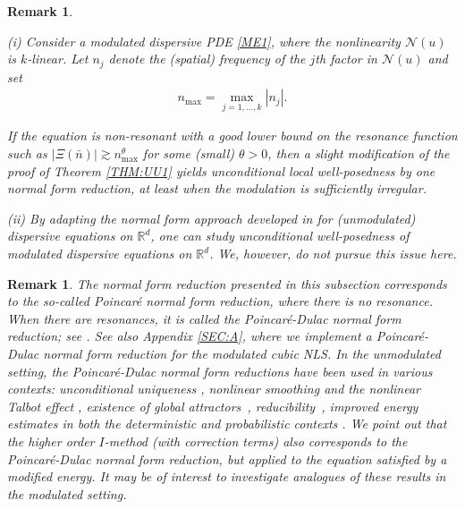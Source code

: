 \documentclass[letterpaper, 11pt,  reqno]{amsart}
\newtheorem{remark}[theorem]{Remark}
\newcommand{\1}{\hspace{0.5mm}\text{I}\hspace{0.5mm}}
\newcommand{\noi}{\noindent}
\newcommand{\R}{\mathbb{R}}
\newcommand{\ta}{\theta}
\newcommand{\ges}{\gtrsim}
\newcommand{\NN}{\mathcal{N}}
\numberwithin{equation}{section}
\numberwithin{theorem}{section}
\begin{document}
\begin{remark}\label{REM:NF9}
\rm


(i) 
Consider 
a modulated dispersive PDE \eqref{ME1}, 
where the nonlinearity $\NN(u)$
is $k$-linear.
Let $n_j$ denote the (spatial) frequency 
of the $j$th factor in $\NN(u)$
and set 
\begin{align}
n_{\max} = \max_{j = 1, \dots, k} |n_j|.
\label{max1}
\end{align}

\noi
If the equation is {\it non-resonant}
with a good lower bound on the resonance function
such as  
$|\Xi(\bar n)|\ges n_{\max}^\ta$
for some (small) $\ta > 0$, 
then
a slight modification of the proof of Theorem \ref{THM:UU1}
yields 
unconditional local well-posedness
by one normal form reduction, 
at least when the modulation is sufficiently irregular.



 




\smallskip

\noi
(ii) 
By adapting the normal form approach 
developed in 
\cite{KOY, Ki2, FO}
for (unmodulated) dispersive equations on $\R^d$, 
one can study unconditional well-posedness of modulated 
dispersive equations on $\R^d$.
We, however, do not pursue this issue here.


\end{remark}








\begin{remark}\label{REM:NF1} \rm
The normal form reduction
presented in this subsection
corresponds to the so-called Poincar\'e normal form reduction, 
where there is no resonance.
When there are resonances, it is called
the Poincar\'e-Dulac normal form reduction;
see \cite[Section 1]{GKO}.
See also Appendix 
 \ref{SEC:A}, 
where 
we implement a Poincar\'e-Dulac normal form reduction for the modulated cubic NLS.
In the unmodulated setting, 
the Poincar\'e-Dulac normal form reductions have been 
used in various contexts:
unconditional uniqueness \cite{BIT, KO, GKO, OW, Ki2, Ki3, MP2, OSW}, 
nonlinear smoothing and the nonlinear Talbot effect \cite{ETz, ETz3, ETz2}, 
existence of global attractors~\cite{ETz3}, 
reducibility~\cite{CGKO}, 
improved energy estimates 
in both the deterministic and probabilistic contexts
\cite{TT, GO, OW2, OST, OS}.
We point out that 
the
higher order $I$-method (with correction terms) \cite{CKSTT03, CKSTT4}
also corresponds to the Poincar\'e-Dulac normal form reduction, 
but applied to the equation satisfied by a modified energy.
It may be of interest to investigate 
analogues of these results
in the modulated setting.





\end{remark}
\end{document}
